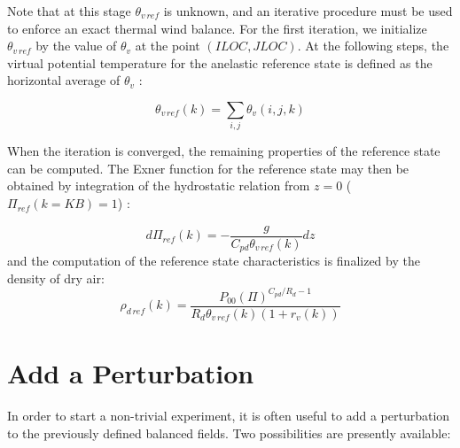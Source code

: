 Note that at this stage $\theta_{v\,ref}$ is unknown, and an iterative
procedure must be used to enforce an exact
 thermal wind balance. For the first iteration, we initialize
$\theta_{v\,ref}$ by the value of $\theta_{v}$ at the point
$(ILOC,JLOC)$. At the following steps,
the virtual potential temperature for the anelastic reference state
is defined as the horizontal average of $\theta_{v}$ :

$$
\theta_{v\,ref}(k) = \sum _{i,j} \theta_{v}(i,j,k)
$$

When the iteration is converged,
the remaining properties of the reference state can be computed.
The Exner function for the
reference state may then be obtained by integration of the hydrostatic relation
from $z=0$ ($\Pi_{ref} (k=KB) =1$) :

$$
d \Pi_{ref}(k) = - \dfrac{g}{C_{pd} \theta_{v\,ref}(k)}  dz
$$
and the computation of the reference state characteristics is finalized
by the density of dry air:
$$
\rho_{d\,ref}(k) = \dfrac{P_{00} (\Pi)^{C_{pd}/R_d - 1} }{R_{d}
\theta_{v\,ref}(k) \left(1+r_{v}(k) \right) }
$$
\section{Add a Perturbation}

In order to start a non-trivial experiment, it is often useful to add
a perturbation to the previously defined balanced fields. Two possibilities
are presently available:

